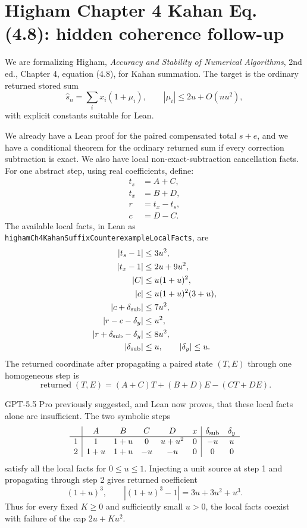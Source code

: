 \documentclass{article}
\begin{document}
\section*{Higham Chapter 4 Kahan Eq. (4.8): hidden coherence follow-up}

We are formalizing Higham, \emph{Accuracy and Stability of Numerical
Algorithms}, 2nd ed., Chapter 4, equation (4.8), for Kahan summation.
The target is the ordinary returned stored sum
\[
  \widehat{s}_n = \sum_i x_i (1+\mu_i),
  \qquad |\mu_i| \le 2u + O(nu^2),
\]
with explicit constants suitable for Lean.

We already have a Lean proof for the paired compensated total \(s+e\), and
we have a conditional theorem for the ordinary returned sum if every correction
subtraction is exact.  We also have local non-exact-subtraction cancellation
facts.  For one abstract step, using real coefficients, define:
\[
\begin{aligned}
t_s &= A+C,\\
t_x &= B+D,\\
r &= t_x - t_s,\\
c &= D-C.
\end{aligned}
\]
The available local facts, in Lean as
\texttt{highamCh4KahanSuffixCounterexampleLocalFacts}, are
\[
\begin{aligned}
|t_s-1|&\le 3u^2,\\
|t_x-1|&\le 2u+9u^2,\\
|C|&\le u(1+u)^2,\\
|c|&\le u(1+u)^2(3+u),\\
|c+\delta_{\rm sub}|&\le 7u^2,\\
|r-c-\delta_y|&\le u^2,\\
|r+\delta_{\rm sub}-\delta_y|&\le 8u^2,\\
|\delta_{\rm sub}|&\le u,\qquad |\delta_y|\le u.
\end{aligned}
\]
The returned coordinate after propagating a paired state \((T,E)\) through one
homogeneous step is
\[
  \operatorname{returned}(T,E) = (A+C)T + (B+D)E - (CT+DE).
\]

GPT-5.5 Pro previously suggested, and Lean now proves, that these local facts
alone are insufficient.  The two symbolic steps
\[
\begin{array}{c|ccccc|cc}
 & A&B&C&D&x&\delta_{\rm sub}&\delta_y\\
\hline
1&1&1+u&0&u+u^2&0&-u&u\\
2&1+u&1+u&-u&-u&0&0&0
\end{array}
\]
satisfy all the local facts for \(0\le u\le1\).  Injecting a unit source at
step 1 and propagating through step 2 gives returned coefficient
\[
  (1+u)^3,\qquad |(1+u)^3-1|=3u+3u^2+u^3.
\]
Thus for every fixed \(K\ge0\) and sufficiently small \(u>0\), the local facts
coexist with failure of the cap \(2u+Ku^2\).
\end{document}

